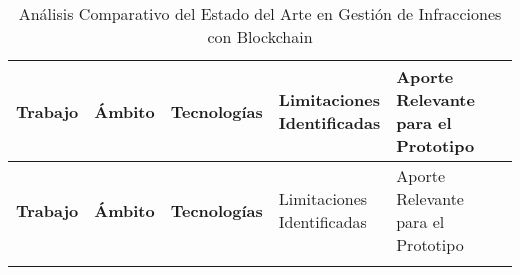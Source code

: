 \begin{longtable}{p{2.5cm} p{2.2cm} p{2.2cm} p{2.5cm} p{3.2cm}}
    \caption{Análisis Comparativo del Estado del Arte en Gestión de Infracciones con Blockchain} \\
        \toprule
        \textbf{Trabajo} & \textbf{Ámbito} & \textbf{Tecnologías} & \shortstack{Limitaciones\\Identificadas} & \shortstack{Aporte Relevante\\para el Prototipo} \\
        \midrule
        \endfirsthead

        \toprule
        \textbf{Trabajo} & \textbf{Ámbito} & \textbf{Tecnologías} & \shortstack{Limitaciones\\Identificadas} & \shortstack{Aporte Relevante\\para el Prototipo} \\
        \midrule
        \endhead
        \endfoot
        

\end{longtable}
